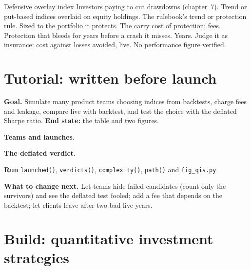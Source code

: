 \begin{strategyfile}{Defensive overlay index}\label{strat:s2:quantitative-investment-strategies:defensive}
 Investors paying to cut drawdowns (chapter~7).
 Trend or put-based indices overlaid on equity holdings.
 The rulebook's trend or protection rule.
 Sized to the portfolio it protects.
 The carry cost of protection; fees.
 Protection that bleeds for years before a crash it misses.
 Years.
 Judge it as insurance: cost against losses avoided, live.
 No performance figure verified.
\end{strategyfile}

\section{Tutorial: written before launch}\label{tut:s2:quantitative-investment-strategies:tut}

\begin{tutorial}
\textbf{Goal.} Simulate many product teams choosing indices from backtests, charge fees and leakage, compare live with backtest, and test the choice
with the deflated Sharpe ratio. \textbf{End state:} the table and two figures.
\begin{tutsteps}
\item \textbf{Teams and launches}.
\label{lst:s2:quantitative-investment-strategies:launch}
\item \textbf{The deflated verdict}.
\label{lst:s2:quantitative-investment-strategies:dsr}
\item \textbf{Run} \texttt{launched()}, \texttt{verdicts()}, \texttt{complexity()}, \texttt{path()} and \texttt{fig\_qis.py}.
\end{tutsteps}
\textbf{What to change next.} Let teams hide failed candidates (count only the survivors) and see the deflated test fooled; add a fee that depends on
the backtest; let clients leave after two bad live years.
\end{tutorial}

\section{Build: quantitative investment strategies}\label{bld:s2:quantitative-investment-strategies:qis}

